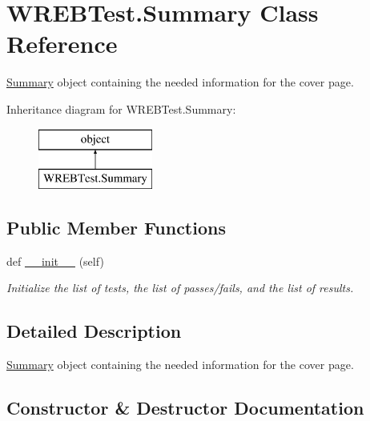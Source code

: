 \hypertarget{class_w_r_e_b_test_1_1_summary}{}\section{W\+R\+E\+B\+Test.\+Summary Class Reference}
\label{class_w_r_e_b_test_1_1_summary}


\hyperlink{class_w_r_e_b_test_1_1_summary}{Summary} object containing the needed information for the cover page.  


Inheritance diagram for W\+R\+E\+B\+Test.\+Summary\+:\begin{figure}[H]
\begin{center}
\leavevmode
\includegraphics[height=2.000000cm]{class_w_r_e_b_test_1_1_summary}
\end{center}
\end{figure}
\subsection*{Public Member Functions}
\begin{DoxyCompactItemize}
\item 
def \hyperlink{class_w_r_e_b_test_1_1_summary_a79a9148558c39dd0445c97603ef836c5}{\+\_\+\+\_\+init\+\_\+\+\_\+} (self)
\begin{DoxyCompactList}\small\item\em Initialize the list of tests, the list of passes/fails, and the list of results. \end{DoxyCompactList}\end{DoxyCompactItemize}


\subsection{Detailed Description}
\hyperlink{class_w_r_e_b_test_1_1_summary}{Summary} object containing the needed information for the cover page. 



\subsection{Constructor \& Destructor Documentation}
